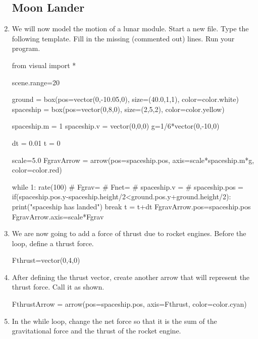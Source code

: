 \begin{enumerate}

\subsection*{Moon Lander}

\item We will now model the motion of a lunar module. Start a new file. Type the following template. Fill in the missing (commented out) lines. Run your program.

\begin{myvpython}
from visual import *

scene.range=20

ground = box(pos=vector(0,-10.05,0), size=(40.0,1,1), color=color.white)
spaceship = box(pos=vector(0,8,0), size=(2,5,2), color=color.yellow)

spaceship.m = 1
spaceship.v = vector(0,0,0)
g=1/6*vector(0,-10,0)

dt = 0.01
t = 0

scale=5.0
FgravArrow = arrow(pos=spaceship.pos, axis=scale*spaceship.m*g, color=color.red)

while 1:
        rate(100)
#        Fgrav=
#        Fnet=
#        spaceship.v = 
#        spaceship.pos = 
        if(spaceship.pos.y-spaceship.height/2<ground.pos.y+ground.height/2):
                print("spaceship has landed")
                break
        t = t+dt
        FgravArrow.pos=spaceship.pos
        FgravArrow.axis=scale*Fgrav
\end{myvpython}

\item We are now going to add a force of thrust due to rocket engines. Before the  loop, define a thrust force.

\begin{myvpython}
	Fthrust=vector(0,4,0)
\end{myvpython}

\item After defining the thrust vector, create another arrow that will represent the thrust force. Call it  as shown.

\begin{myvpython}
FthrustArrow = arrow(pos=spaceship.pos, axis=Fthrust, color=color.cyan)
\end{myvpython}

\item In the while loop, change the net force so that it is the sum of the gravitational force and the thrust of the rocket engine.


\end{enumerate}
